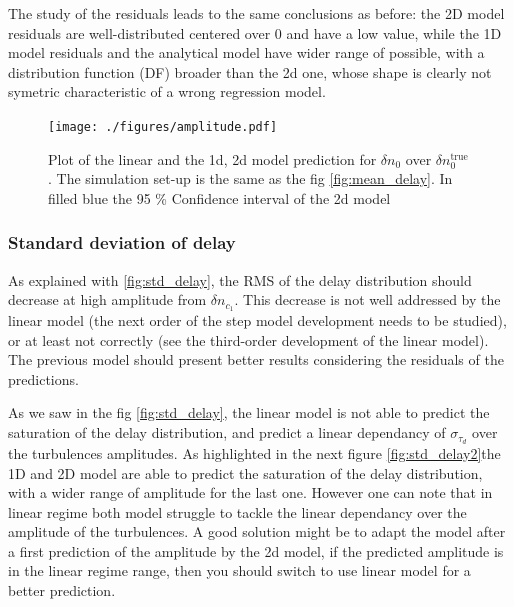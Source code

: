 \documentclass[11pt,openany]{report}
\begin{document}
\begin{multicols}{2}
    The study of the residuals leads to the same conclusions as before: the 2D model residuals are well-distributed centered over 0 and have a low value, while the 1D model residuals and the analytical model have wider range of possible, with a distribution function (DF) broader than the 2d one, whose shape is clearly not symetric characteristic of a wrong regression model.
    \begin{figure}[H]
        \centering
        \hspace*{-.2cm}\texttt{[image: ./figures/amplitude.pdf]}
        \label{}
        \caption{Plot of the linear and the 1d, 2d model prediction for $\delta n_0$ over  $\delta n_0^{\text{true}}$. The simulation set-up is the same as the fig \ref{fig:mean_delay}. In filled blue the 95 \% Confidence interval of the 2d model}
    \end{figure}



    \subsubsection{Standard deviation of delay}

    As explained with \ref{fig:std_delay}, the RMS of the delay distribution should decrease at high amplitude from \(\delta n_{c_1}\). This decrease is not well addressed by the linear model (the next order of the step model development needs to be studied), or at least not correctly (see the third-order development of the linear model). The previous model should present better results considering the residuals of the predictions.

    As we saw in the fig \ref{fig:std_delay}, the linear model is not able to predict the saturation of the delay distribution, and predict a linear dependancy of $\sigma_{\tau_d}$ over the turbulences amplitudes. As highlighted in the next figure \ref{fig:std_delay2}the 1D and 2D model are able to predict the saturation of the delay distribution, with a wider range of amplitude for the last one. However one can note that in linear regime both model struggle to tackle the linear dependancy over the amplitude of the turbulences. A good solution might be to adapt the model after a first prediction of the amplitude by the 2d model, if the predicted amplitude is in the linear regime range, then you should switch to use linear model for a better prediction.


\end{multicols}
\end{document}
